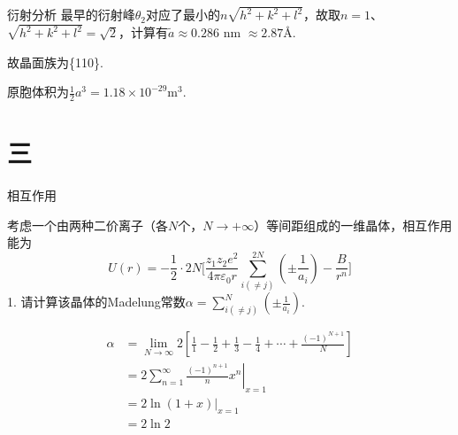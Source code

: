 \documentclass{beamer}
\begin{document}
\begin{frame}[t]{衍射分析}
    最早的衍射峰$\theta_2$对应了最小的$n\sqrt{h^2 +k^2 +l^2}$，故取$n=1$、$\sqrt{h^2 + k^2 +l^2}=\sqrt{2}$，计算有$\tilde{a}\approx 0.286$ nm $ \approx 2.87 $\AA.\par
    故晶面族为\{110\}.\par
    \vspace{0.1cm}
    原胞体积为$\frac{1}{2}a^3=1.18\times 10^{-29}$m$^3$.
    
\end{frame}

\section{三}
\begin{frame}[t]{相互作用}

    {\kaishu
    \qquad 考虑一个由两种二价离子（各$N$个，$N\rightarrow +\infty$）等间距组成的一维晶体，相互作用能为
    \vspace{-0.15cm}
    \[
    U(r)=-\frac{1}{2}\cdot 2N\Biggl[\frac{z_{1}z_{2}e^{2}}{4\pi\varepsilon_{0}r}\sum_{i(\neq j)}^{2N}(\pm\frac{1}{a_{i}})-\frac{B}{r^{n}}\Biggr]
    \]
    \vspace{-0.4cm}
    1. 请计算该晶体的Madelung常数$\alpha = \sum_{i(\neq j)}^{N}(\pm\frac{1}{a_{i}})$.\par
    }
    
    \begin{align*}
        \alpha & = \lim_{N \to \infty}2\left [ \frac{1}{1}-\frac{1}{2}+\frac{1}{3}-\frac{1}{4} + \cdots + \frac{(-1)^{N+1}}{N}\right ] \\
             & = 2\left . \sum_{n=1}^{\infty}\frac{(-1)^{n+1}}{n}x^n \right|_{x=1} \\
             & = 2 \left . \ln (1+x) \right|_{x=1}\\
             & = 2\ln 2     
    \end{align*}

\end{frame}
\end{document}
